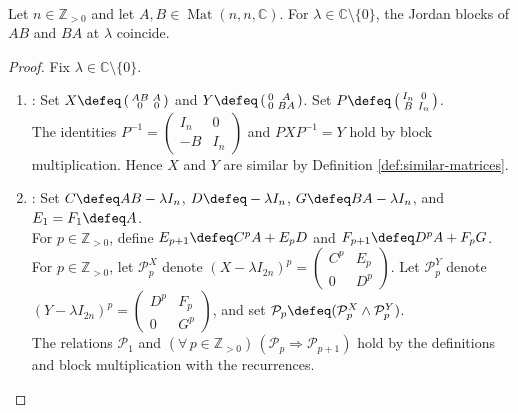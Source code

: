 \begin{theorem} \label{thm:ab-ba-same-nonzero-jordan-blocks} \\
Let $n\in\mathbb{Z}_{>0}$ and let $A,B\in\operatorname{Mat}(n,n,\mathbb{C})$. For $\lambda\in\mathbb{C}\setminus\{0\}$, the Jordan blocks of $AB$ and $BA$ at $\lambda$ coincide.
\begin{proof}
Fix $\lambda\in\mathbb{C}\setminus\{0\}$.
\begin{enumerate}[label=(\roman*)]
\setlength{\itemsep}{0pt}
\item {}: Set $X\defeq\left(\begin{smallmatrix}AB&A\\0&0\end{smallmatrix}\right)$ and $Y\defeq\left(\begin{smallmatrix}0&A\\0&BA\end{smallmatrix}\right)$. Set $P\defeq\left(\begin{smallmatrix}I_n&0\\B&I_n\end{smallmatrix}\right)$.\\
The identities $P^{-1}=\left(\begin{smallmatrix}I_n&0\\-B&I_n\end{smallmatrix}\right)$ and $PXP^{-1}=Y$ hold by block multiplication. Hence $X$ and $Y$ are similar by Definition \ref{def:similar-matrices}.
\item {}: Set $C\defeq AB-\lambda I_n$, $D\defeq-\lambda I_n$, $G\defeq BA-\lambda I_n$, and $E_1=F_1\defeq A$.\\
For $p\in\mathbb{Z}_{>0}$, define $E_{p+1}\defeq C^pA+E_pD$ and $F_{p+1}\defeq D^pA+F_pG$.\\
For $p\in\mathbb{Z}_{>0}$, let $\mathcal{P}_p^X$ denote $(X-\lambda I_{2n})^p=\left(\begin{smallmatrix}C^p&E_p\\0&D^p\end{smallmatrix}\right)$. Let $\mathcal{P}_p^Y$ denote $(Y-\lambda I_{2n})^p=\left(\begin{smallmatrix}D^p&F_p\\0&G^p\end{smallmatrix}\right)$, and set $\mathcal{P}_p\defeq(\mathcal{P}_p^X\land\mathcal{P}_p^Y)$.\\
The relations $\mathcal{P}_1$ and $(\forall\,p\in\mathbb{Z}_{>0})\,(\mathcal{P}_p\Longrightarrow\mathcal{P}_{p+1})$ hold by the definitions and block multiplication with the recurrences.\\

\end{enumerate}
\end{proof}
\end{theorem}
